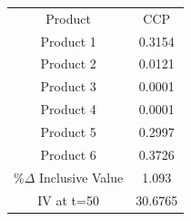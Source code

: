 \begin{tabular}{cc}
Product & CCP \\
Product 1 & 0.3154 \\
Product 2 & 0.0121 \\
Product 3 & 0.0001 \\
Product 4 & 0.0001 \\
Product 5 & 0.2997 \\
Product 6 & 0.3726 \\
$\%\Delta$ Inclusive Value & 1.093 \\
IV at t=50 & 30.6765 \\
\end{tabular}